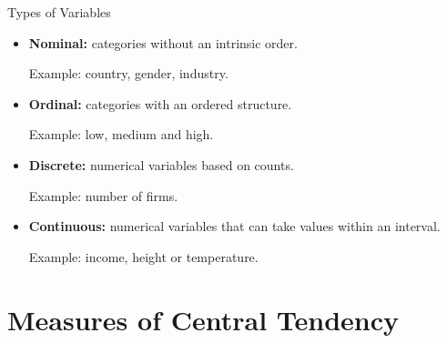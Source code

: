 \documentclass{beamer}
\begin{document}
\begin{frame}{Types of Variables}

\begin{itemize}

  \item \textbf{Nominal:} categories without an intrinsic order.

  \vskip 0.2cm

  Example: country, gender, industry.

  \vskip 0.4cm

  \item \textbf{Ordinal:} categories with an ordered structure.

  \vskip 0.2cm

  Example: low, medium and high.

  \vskip 0.4cm

  \item \textbf{Discrete:} numerical variables based on counts.

  \vskip 0.2cm

  Example: number of firms.

  \vskip 0.4cm

  \item \textbf{Continuous:} numerical variables that can take values within an interval.

  \vskip 0.2cm

  Example: income, height or temperature.

\end{itemize}

\end{frame}



\section{Measures of Central Tendency}
\end{document}
